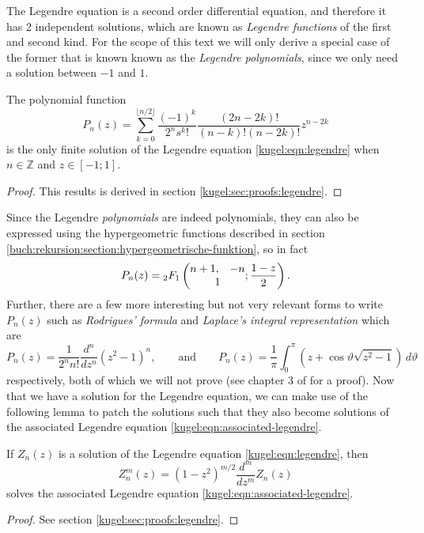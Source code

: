 The Legendre equation is a second order differential equation, and therefore it
has 2 independent solutions, which are known as \emph{Legendre functions} of the
first and second kind. For the scope of this text we will only derive a special
case of the former that is known known as the \emph{Legendre polynomials}, since
we only need a solution between $-1$ and $1$.

\begin{lemma}
  \label{kugel:thm:legendre-poly}
  The polynomial function
  \[
    P_n(z) = \sum^{\lfloor n/2 \rfloor}_{k=0}
      \frac{(-1)^k}{2^n s^k!} \frac{(2n - 2k)!}{(n - k)! (n-2k)!} z^{n - 2k}
  \]
  is the only finite solution of the Legendre equation
  \eqref{kugel:eqn:legendre} when $n \in \mathbb{Z}$ and $z \in [-1; 1]$.
\end{lemma}
\begin{proof}
  This results is derived in section \ref{kugel:sec:proofs:legendre}.
\end{proof}

Since the Legendre \emph{polynomials} are indeed polynomials, they can also be
expressed using the hypergeometric functions described in section
\ref{buch:rekursion:section:hypergeometrische-funktion}, so in fact
\begin{equation}
  P_n(z) = {}_2F_1 \left( \begin{matrix}
    n + 1, & -n \\ \multicolumn{2}{c}{1}
  \end{matrix} ; \frac{1 - z}{2} \right).
\end{equation}
Further, there are a few more interesting but not very relevant forms to write
$P_n(z)$ such as \emph{Rodrigues' formula} and \emph{Laplace's integral
representation} which are
\begin{equation*}
  P_n(z) = \frac{1}{2^n n!} \frac{d^n}{dz^n} (z^2 - 1)^n,
  \qquad \text{and} \qquad
  P_n(z) = \frac{1}{\pi} \int_0^\pi \left(
    z + \cos\vartheta \sqrt{z^2 - 1}
  \right) \, d\vartheta
\end{equation*}
respectively, both of which we will not prove (see chapter 3 of
\cite{bell_special_2004} for a proof). Now that we have a solution for the
Legendre equation, we can make use of the following lemma to patch the solutions
such that they also become solutions of the associated Legendre equation
\eqref{kugel:eqn:associated-legendre}.

\begin{lemma} \label{kugel:thm:extend-legendre}
  If $Z_n(z)$ is a solution of the Legendre equation \eqref{kugel:eqn:legendre},
  then
  \begin{equation*}
    Z^m_n(z) = (1 - z^2)^{m/2} \frac{d^m}{dz^m}Z_n(z)
  \end{equation*}
  solves the associated Legendre equation \eqref{kugel:eqn:associated-legendre}.
  \nocite{bell_special_2004}
\end{lemma}
\begin{proof}
  See section \ref{kugel:sec:proofs:legendre}.
\end{proof}

